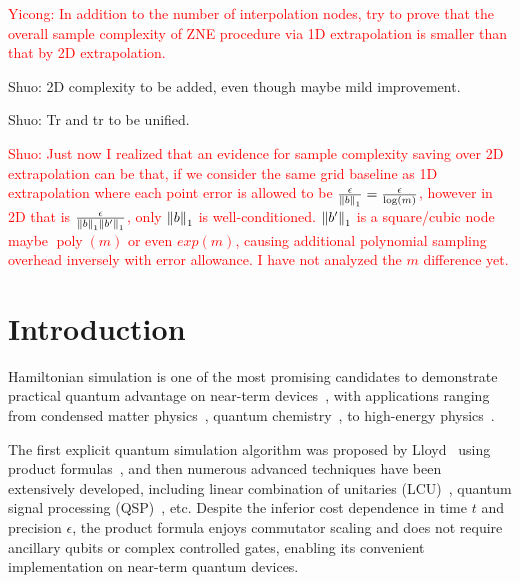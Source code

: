 \documentclass[11pt]{article}
\newcommand{\xz}[1]{{\color{cyan} XZ: #1}}
\newcommand{\sz}[1]{{\color{blue} Shuo: #1}}
\begin{document}
\textcolor{red}{Yicong: In addition to the number of interpolation nodes, try to prove that the overall sample complexity of ZNE procedure via 1D extrapolation is smaller than that by 2D extrapolation.}

\sz{2D complexity to be added, even though maybe mild improvement.}

\sz{Tr and tr to be unified.}

\textcolor{red}{Shuo: Just now I realized that an evidence for sample complexity saving over 2D extrapolation can be that, if we consider the same grid baseline as 1D extrapolation where each point error is allowed to be $\frac{\epsilon}{\norm{b}_1}=\frac{\epsilon}{\log(m)}$, however in 2D that is $\frac{\epsilon}{\norm{b}_1\norm{b'}_1}$, only $\norm{b}_1$ is well-conditioned. $\norm{b'}_1$ is a square/cubic node maybe $\operatorname{poly}(m)$ or even $exp(m)$, causing additional polynomial sampling overhead inversely with error allowance. I have not analyzed the $m$ difference yet.}


\section{Introduction}
Hamiltonian simulation is one of the most promising candidates to demonstrate practical quantum advantage on near-term devices~\cite{kim2023evidence}, with applications ranging from condensed matter physics~\cite{childs2018toward}, quantum chemistry~\cite{mcardle2020quantum}, to high-energy physics~\cite{bauer2023quantum}.

The first explicit quantum simulation algorithm was proposed by Lloyd~\cite{doi:10.1126/science.273.5278.1073} using product formulas~\cite{suzuki1985decomposition,suzuki1991general}, and then numerous advanced techniques have been extensively developed, including linear combination of unitaries (LCU)~\cite{childs2012hamiltonian, dominic_w_berry_simulating_2015}, quantum signal processing (QSP)~\cite{Low_2017, low2019hamiltonian}, etc. Despite the inferior cost dependence in time $t$ and precision $\epsilon$, the product formula enjoys commutator scaling and does not require ancillary qubits or complex controlled gates, enabling its convenient implementation on near-term quantum devices.
\end{document}
